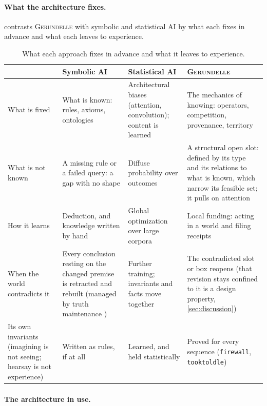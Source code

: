 \documentclass[11pt]{article}
\newcommand{\gerundelle}{\textsc{Gerundelle}}
\newcommand{\leanus}{\textunderscore\allowbreak}
\newcommand{\lean}[1]{{\let\_\leanus\texttt{#1}}}
\theoremstyle{remark}
\begin{document}
\paragraph{What the architecture fixes.}

 contrasts \gerundelle{} with symbolic and statistical AI by what each
fixes in advance and what each leaves to experience.

\begin{table}[t]
\centering
\small
\begin{tabular}{@{}p{2.6cm}p{3.9cm}p{3.9cm}p{4.2cm}@{}}
\toprule
 & Symbolic AI & Statistical AI & \gerundelle{} \\
\midrule
What is fixed & What is known: rules, axioms, ontologies & Architectural biases
(attention, convolution); content is learned & The mechanics of knowing: operators,
competition, provenance, territory \\[3pt]
What is not known & A missing rule or a failed query: a gap with no shape & Diffuse
probability over outcomes & A structural open slot: defined by its type and its
relations to what is known, which narrow its feasible set; it pulls on attention \\[3pt]
How it learns & Deduction, and knowledge written by hand & Global optimization over large
corpora & Local funding: acting in a world and filing receipts \\[3pt]
When the world contradicts it & Every conclusion resting on the changed premise is
retracted and rebuilt (managed by truth maintenance \citep{Doyle1979}) & Further training;
invariants and facts move together & The contradicted slot or box reopens (that revision
stays confined to it is a design property, \cref{sec:discussion}) \\[3pt]
Its own invariants (imagining is not seeing; hearsay is not experience) & Written as rules,
if at all & Learned, and held statistically & Proved for every sequence
(\lean{firewall}, \lean{took\_told\_le}) \\
\bottomrule
\end{tabular}
\caption{What each approach fixes in advance and what it leaves to experience.}
\label{tab:paradigms}
\end{table}

\paragraph{The architecture in use.}
\end{document}
